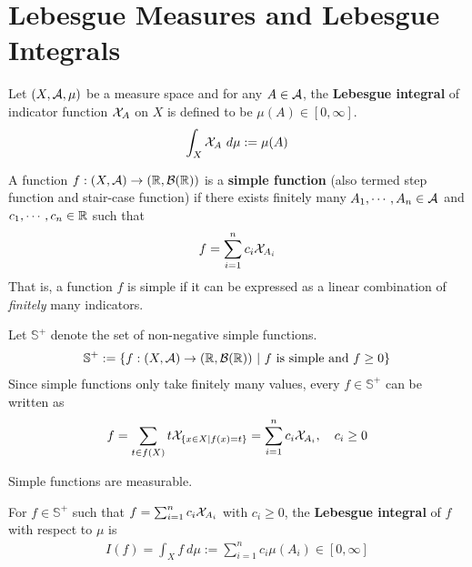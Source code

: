 \documentclass[11pt]{article}
\begin{document}
	\section{Lebesgue Measures and Lebesgue Integrals}
	\begin{definition}
		Let $(X, \mathcal{{A}}, \mu)$ be a measure space and for any $A \in \mathcal{{A}}$, the \textbf{Lebesgue integral} of indicator function $\mathcal{{X}}_A$ on $X$ is defined to be $\mu(A) \in [0, \infty]$.
		\begin{align}
			\int_X \mathcal{{X}}_A\ d\mu := \mu(A)
		\end{align}
	\end{definition}
	
	\begin{definition}
		A function $f: (X, \mathcal{{A}}) \to (\mathbb{R}, \mathcal{{B}}(\mathbb{R}))$ is a \textbf{simple function} (also termed step function and stair-case function) if there exists finitely many $A_1, \cdots, A_n \in \mathcal{{A}}$ and $c_1, \cdots, c_n \in \mathbb{R}$ such that
		\begin{align}
			f = \sum_{i=1}^n c_i \mathcal{{X}}_{A_i}
		\end{align}
		That is, a function $f$ is simple if it can be expressed as a linear combination of \emph{finitely} many indicators.
		
		Let $\mathbb{S}^+$ denote the set of non-negative simple functions.
		\begin{align}
			\mathbb{S}^+ := \left\{
				f: (X, \mathcal{{A}}) \to (\mathbb{R}, \mathcal{{B}}(\mathbb{R}))\ \vert\ f \text{{ is simple and }} f \geq 0
			\right\}
		\end{align}
		Since simple functions only take finitely many values, every $f \in \mathbb{S}^+$ can be written as
		\begin{align}
			f = \sum_{t \in f(X)} t \mathcal{{X}}_{\{x\in X|f(x) = t\}} = \sum_{i=1}^n c_i \mathcal{{X}}_{A_i}, \quad c_i \geq 0
		\end{align}
	\end{definition}
	
	\begin{theorem}
		Simple functions are measurable.
	\end{theorem}

	
	\begin{definition}
		For $f \in \mathbb{S}^+$ such that $f = \sum_{i=1}^n c_i \mathcal{{X}}_{A_i}$ with $c_i \geq 0$, the \textbf{Lebesgue integral} of $f$ with respect to $\mu$ is
		\begin{align}
			I(f) = \int_X f\ d\mu := \sum_{i=1}^n c_i \mu(A_i) \in [0, \infty]
		\end{align}
	\end{definition}
	
\end{document}
